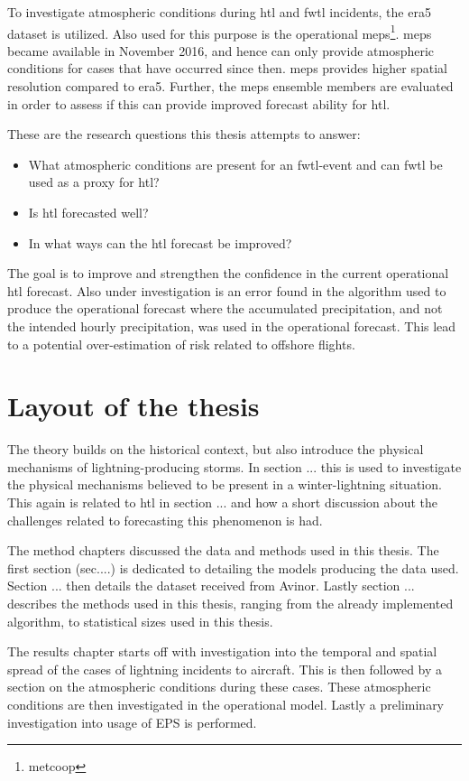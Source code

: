 To investigate atmospheric conditions during \acrshort{htl} and \acrshort{fwtl} incidents, the \acrfull{era5} dataset is utilized. Also used for this purpose is the operational \acrfull{meps}\footnote{\acrfull{metcoop}}. \acrshort{meps} became available in November 2016, and hence can only provide atmospheric conditions for cases that have occurred since then. \acrshort{meps} provides higher spatial resolution compared to \acrshort{era5}. Further, the \acrshort{meps} ensemble members are evaluated in order to assess if this can provide improved forecast ability for \acrshort{htl}.

These are the research questions this thesis attempts to answer:
\begin{itemize}	
    \item What atmospheric conditions are present for an \acrshort{fwtl}-event and can \acrshort{fwtl} be used as a proxy for \acrshort{htl}? 
    \item Is \acrshort{htl} forecasted well?
    \item In what ways can the \acrshort{htl} forecast be improved?
\end{itemize}

The goal is to improve and strengthen the confidence in the current operational \acrshort{htl} forecast. Also under investigation is an error found in the algorithm used to produce the operational forecast where the accumulated precipitation, and not the intended hourly precipitation, was used in the operational forecast. This lead to a potential over-estimation of risk related to offshore flights.

\section{Layout of the thesis}

The theory builds on the historical context, but also introduce the physical mechanisms of lightning-producing storms. In section ... this is used to investigate the physical mechanisms believed to be present in a winter-lightning situation. This again is related to \acrfull{htl} in section ... and how a short discussion about the challenges related to forecasting this phenomenon is had.

The method chapters discussed the data and methods used in this thesis. The first section (sec....) is dedicated to detailing the models producing the data used. Section ... then details the dataset received from Avinor. Lastly section ... describes the methods used in this thesis, ranging from the already implemented algorithm, to statistical sizes used in this thesis.

The results chapter starts off with investigation into the temporal and spatial spread of the cases of lightning incidents to aircraft. This is then followed by a section on the atmospheric conditions during these cases. These atmospheric conditions are then investigated in the operational model. Lastly a preliminary investigation into usage of EPS is performed.




